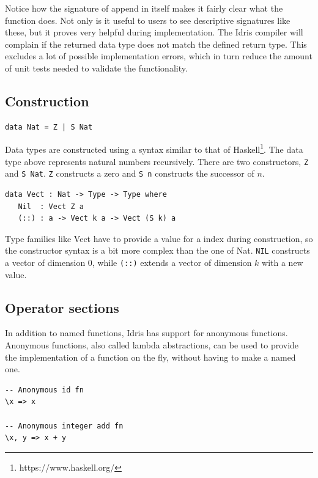 \documentclass[12pt]{article}
\begin{document}
Notice how the signature of append in itself makes it fairly clear what the function does.
Not only is it useful to users to see descriptive signatures like these, but it proves very helpful during implementation.
The Idris compiler will complain if the returned data type does not match the defined return type.
This excludes a lot of possible implementation errors, which in turn reduce the amount of unit tests needed to validate the functionality.

\subsection{Construction}

\begin{lstlisting}[caption={Natural Numbers Example},label={lst:nats_example}]
data Nat = Z | S Nat
\end{lstlisting}

Data types are constructed using a syntax similar to that of Haskell\footnote{https://www.haskell.org/}.
The data type above represents natural numbers recursively.
There are two constructors, \lstinline{Z} and \lstinline{S Nat}.
\lstinline{Z} constructs a zero and \lstinline{S n} constructs the successor of $n$.

\begin{lstlisting}[caption={Vector Example},label={lst:vect_example_def}]
data Vect : Nat -> Type -> Type where
   Nil  : Vect Z a
   (::) : a -> Vect k a -> Vect (S k) a
\end{lstlisting}

Type families like Vect have to provide a value for a index during construction, so the constructor syntax is a bit more complex than the one of Nat.
\lstinline{NIL} constructs a vector of dimension 0, while \lstinline{(::)} extends a vector of dimension $k$ with a new value.

\subsection{Operator sections}

In addition to named functions, Idris has support for anonymous functions.
Anonymous functions, also called lambda abstractions, can be used to provide the implementation of a function on the fly, without having to make a named one.

\begin{lstlisting}[caption={Anonymous functions Example},label={lst:anon_fns}]
-- Anonymous id fn
\x => x

-- Anonymous integer add fn
\x, y => x + y
\end{lstlisting}
\end{document}
